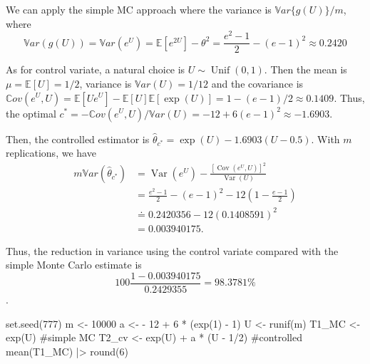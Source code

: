 \documentclass[
  letterpaper,
  DIV=11,
  numbers=noendperiod]{scrreprt}
\newenvironment{Shaded}{\begin{snugshade}}{\end{snugshade}}
\newcommand{\CommentTok}[1]{\textcolor[rgb]{0.37,0.37,0.37}{#1}}
\newcommand{\DecValTok}[1]{\textcolor[rgb]{0.68,0.00,0.00}{#1}}
\newcommand{\FunctionTok}[1]{\textcolor[rgb]{0.28,0.35,0.67}{#1}}
\newcommand{\NormalTok}[1]{\textcolor[rgb]{0.00,0.23,0.31}{#1}}
\newcommand{\OtherTok}[1]{\textcolor[rgb]{0.00,0.23,0.31}{#1}}
\newcommand{\SpecialCharTok}[1]{\textcolor[rgb]{0.37,0.37,0.37}{#1}}
\begin{document}
We can apply the simple MC approach where the variance is
\(\mathbb{V}ar\{g(U)\}/m\), where \[
\mathbb{V}ar(g(U))=\mathbb{V}ar\left(e^U\right)=\mathbb{E}\left[e^{2 U}\right]-\theta^2=\frac{e^2-1}{2}-(e-1)^2 \approx 0.2420
\]

As for control variate, a natural choice is
\(U\sim\operatorname{Unif}(0,1)\). Then the mean is
\(\mu=\mathbb{E}[U]=1/2\), variance is \(\mathbb{V}ar(U) = 1/12\) and
the covariance is
\(\mathbb{C}ov(e^U, U)= \mathbb{E}[Ue^U]-\mathbb{E}[U]\mathbb{E}[\exp(U)]= 1-(e-1)/2 \approx 0.1409\).
Thus, the optimal
\(c^* = -\mathbb{C}ov(e^U,U)/\mathbb{V}ar(U) =-12+6(e-1)^2 \approx -1.6903\).

Then, the controlled estimator is
\(\hat{\theta}_{c^\ast}=\exp(U)-1.6903(U-0.5)\). With \(m\)
replications, we have \[
\begin{aligned}
m\mathbb{V}ar(\hat{\theta}_{c^\ast})
&=\operatorname{Var}\left(e^U\right)-\frac{\left[\operatorname{Cov}\left(e^U, U\right)\right]^2}{\operatorname{Var}(U)} \\ &=\frac{e^2-1}{2}-(e-1)^2-12\left(1-\frac{e-1}{2}\right) \\
& \doteq 0.2420356-12(0.1408591)^2 \\
& =0.003940175 .
\end{aligned}
\]

Thus, the reduction in variance using the control variate compared with
the simple Monte Carlo estimate is
\[100 \frac{1-0.003940175}{0.2429355} = 98.3781 \%\].

\begin{Shaded}
\begin{Highlighting}[]
\FunctionTok{set.seed}\NormalTok{(}\DecValTok{777}\NormalTok{)}
\NormalTok{m }\OtherTok{\textless{}{-}} \DecValTok{10000}
\NormalTok{a }\OtherTok{\textless{}{-}} \SpecialCharTok{{-}} \DecValTok{12} \SpecialCharTok{+} \DecValTok{6} \SpecialCharTok{*}\NormalTok{ (}\FunctionTok{exp}\NormalTok{(}\DecValTok{1}\NormalTok{) }\SpecialCharTok{{-}} \DecValTok{1}\NormalTok{)}
\NormalTok{U }\OtherTok{\textless{}{-}} \FunctionTok{runif}\NormalTok{(m)}
\NormalTok{T1\_MC }\OtherTok{\textless{}{-}} \FunctionTok{exp}\NormalTok{(U) }\CommentTok{\#simple MC}
\NormalTok{T2\_cv }\OtherTok{\textless{}{-}} \FunctionTok{exp}\NormalTok{(U) }\SpecialCharTok{+}\NormalTok{ a }\SpecialCharTok{*}\NormalTok{ (U }\SpecialCharTok{{-}} \DecValTok{1}\SpecialCharTok{/}\DecValTok{2}\NormalTok{) }\CommentTok{\#controlled}
\FunctionTok{mean}\NormalTok{(T1\_MC) }\SpecialCharTok{|\textgreater{}} \FunctionTok{round}\NormalTok{(}\DecValTok{6}\NormalTok{)}
\end{Highlighting}
\end{Shaded}
\end{document}
